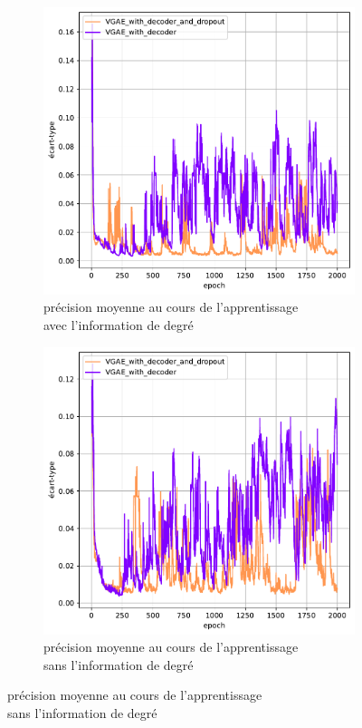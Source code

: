 \documentclass{article}
\begin{document}
\begin{figure}[H]
    \centering
    \captionsetup{justification=centering}
    \begin{subfigure}{0.45\textwidth}
      \includegraphics[width=\textwidth]{graphics/APs_degree_decoder_dropout_std.svg.pdf}
      \centering
      \caption{précision moyenne au cours de l'apprentissage\\ avec l'information de degré}
    \end{subfigure}
    \begin{subfigure}{0.45\textwidth}
      \includegraphics[width=\textwidth]{graphics/APs_no_degree_decoder_dropout_std.svg.pdf}
      \centering
      \caption{précision moyenne au cours de l'apprentissage\\ sans l'information de degré}
    \end{subfigure}
    

\end{figure}
\end{document}
